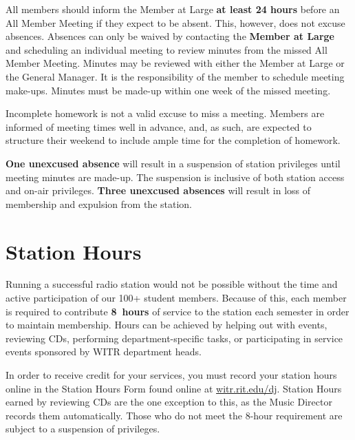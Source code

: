 \documentclass{witrman}
\begin{document}
All members should inform the Member at Large \textbf{at least 24 hours} before
an All Member Meeting if they expect to be absent.  This, however, does not
excuse absences.  Absences can only be waived by contacting the \textbf{Member
at Large} and scheduling an individual meeting to review minutes from the missed
All Member Meeting.  Minutes may be reviewed with either the Member at Large or
the General Manager.  It is the responsibility of the member to schedule meeting
make-ups.  Minutes must be made-up within one week of the missed meeting.

Incomplete homework is not a valid excuse to miss a meeting. Members are
informed of meeting times well in advance, and, as such, are expected to
structure their weekend to include ample time for the completion of homework.

\textbf{One unexcused absence} will result in a suspension of station privileges
until meeting minutes are made-up.  The suspension is inclusive of both station
access and on-air privileges.  \textbf{Three unexcused absences} will result in
loss of membership and expulsion from the station.

\section{Station Hours}
Running a successful radio station would not be possible without the time and
active participation of our 100+ student members. Because of this, each member
is required to contribute \textbf{8~hours} of service to the station each
semester in order to maintain membership. Hours can be achieved by helping out
with events, reviewing CDs, performing department-specific tasks, or
participating in service events sponsored by WITR department heads.

In order to receive credit for your services, you must record your station hours
online in the Station Hours Form found online at
\href{http://witr.rit.edu/dj}{witr.rit.edu/dj}. Station Hours earned by
reviewing CDs are the one exception to this, as the Music Director records them
automatically. Those who do not meet the 8-hour requirement are subject to a
suspension of privileges.
\end{document}
